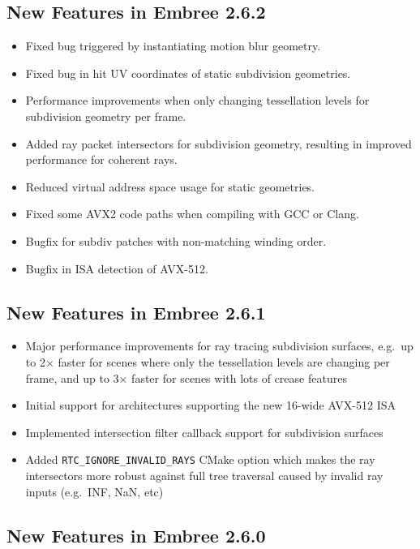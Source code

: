\subsection{New Features in Embree
2.6.2}\label{new-features-in-embree-2.6.2}

\begin{itemize}
\tightlist
\item
  Fixed bug triggered by instantiating motion blur geometry.
\item
  Fixed bug in hit UV coordinates of static subdivision geometries.
\item
  Performance improvements when only changing tessellation levels for
  subdivision geometry per frame.
\item
  Added ray packet intersectors for subdivision geometry, resulting in
  improved performance for coherent rays.
\item
  Reduced virtual address space usage for static geometries.
\item
  Fixed some AVX2 code paths when compiling with GCC or Clang.
\item
  Bugfix for subdiv patches with non-matching winding order.
\item
  Bugfix in ISA detection of AVX-512.
\end{itemize}

\subsection{New Features in Embree
2.6.1}\label{new-features-in-embree-2.6.1}

\begin{itemize}
\tightlist
\item
  Major performance improvements for ray tracing subdivision surfaces,
  e.g.~up to 2× faster for scenes where only the tessellation levels are
  changing per frame, and up to 3× faster for scenes with lots of crease
  features
\item
  Initial support for architectures supporting the new 16-wide AVX-512
  ISA
\item
  Implemented intersection filter callback support for subdivision
  surfaces
\item
  Added \texttt{RTC\_IGNORE\_INVALID\_RAYS} CMake option which makes the
  ray intersectors more robust against full tree traversal caused by
  invalid ray inputs (e.g.~INF, NaN, etc)
\end{itemize}

\subsection{New Features in Embree
2.6.0}\label{new-features-in-embree-2.6.0}

